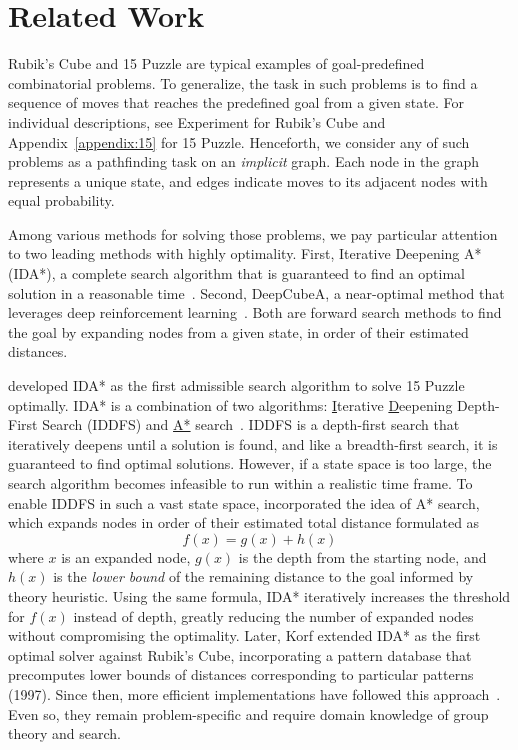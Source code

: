 \documentclass[nohyperref]{article}
\theoremstyle{plain}
\theoremstyle{definition}
\theoremstyle{remark}
\begin{document}
\section{Related Work}
Rubik's Cube and 15 Puzzle are typical examples of goal-predefined combinatorial problems.
To generalize, the task in such problems is to find a sequence of moves that reaches the predefined goal from a given state.
For individual descriptions, see Experiment for Rubik's Cube and Appendix~\ref{appendix:15} for 15 Puzzle.
Henceforth, we consider any of such problems as a pathfinding task on an \textit{implicit} graph.
Each node in the graph represents a unique state, and edges indicate moves to its adjacent nodes with equal probability.

Among various methods for solving those problems, we pay particular attention to two leading methods with highly optimality.
First, Iterative Deepening A* (IDA*), a complete search algorithm that is guaranteed to find an optimal solution in a reasonable time~\citep{korf1985depth,korf1997finding}.
Second, DeepCubeA, a near-optimal method that leverages deep reinforcement learning~\citep{agostinelli2019solving}.
Both are forward search methods to find the goal by expanding nodes from a given state, in order of their estimated distances.

\citet{korf1985depth} developed IDA* as the first admissible search algorithm to solve 15 Puzzle optimally.
IDA* is a combination of two algorithms: \underline{I}terative \underline{D}eepening Depth-First Search (IDDFS) and \underline{A*} search~\citep{hart1968formal}.
IDDFS is a depth-first search that iteratively deepens until a solution is found, and like a breadth-first search, it is guaranteed to find optimal solutions.
However, if a state space is too large, the search algorithm becomes infeasible to run within a realistic time frame.
To enable IDDFS in such a vast state space, \citet{korf1985depth} incorporated the idea of A* search, which expands nodes in order of their estimated total distance formulated as
\begin{equation}
    f(x) = g(x)+h(x)
    \label{eq:astar}
\end{equation}
where $x$ is an expanded node, $g(x)$ is the depth from the starting node, and $h(x)$ is the \textit{lower bound} of the remaining distance to the goal informed by theory heuristic.
Using the same formula, IDA* iteratively increases the threshold for $f(x)$ instead of depth, greatly reducing the number of expanded nodes without compromising the optimality.
Later, Korf extended IDA* as the first optimal solver against Rubik's Cube, incorporating a pattern database that precomputes lower bounds of distances corresponding to particular patterns (1997).
Since then, more efficient implementations have followed this approach~\citep{korf2008linear,arfaee2011learning,rokicki2014diameter}.
Even so, they remain problem-specific and require domain knowledge of group theory and search.
\end{document}
